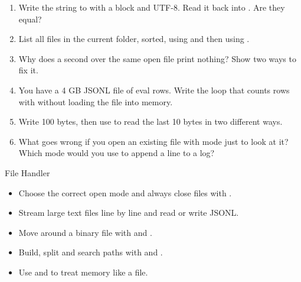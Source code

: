 \begin{practice}
\begin{enumerate}[nosep,leftmargin=*]
  \item Write the string  to 
        with a  block and UTF-8. Read it back into . Are they equal?
  \item List all  files in the current folder, sorted, using  and then
        using .
  \item Why does a second  over the same open file print nothing? Show two
        ways to fix it.
  \item You have a 4 GB JSONL file of eval rows. Write the loop that counts rows with
         without loading the file into memory.
  \item Write 100 bytes, then use  to read the last 10 bytes in two different ways.
  \item What goes wrong if you open an existing file with mode  just to look at it?
        Which mode would you use to append a line to a log?
\end{enumerate}
\end{practice}

\begin{achievement}{File Handler}
\begin{itemize}[nosep,leftmargin=*]
  \item Choose the correct open mode and always close files with .
  \item Stream large text files line by line and read or write JSONL.
  \item Move around a binary file with  and .
  \item Build, split and search paths with  and .
  \item Use  and  to treat memory like a file.
\end{itemize}
\end{achievement}
